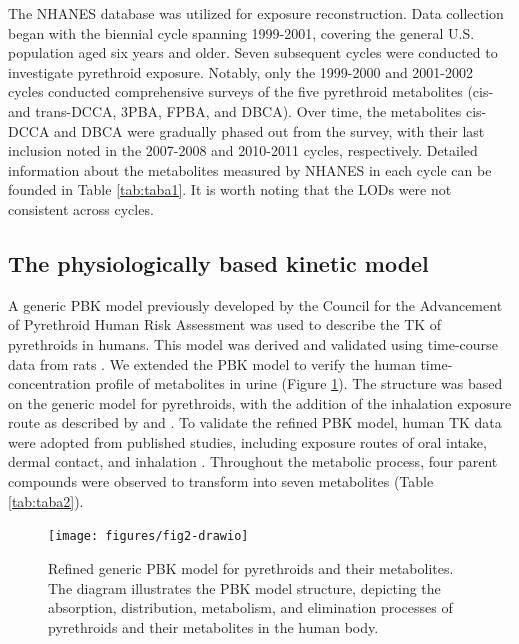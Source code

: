 \documentclass[toxics,article,submit,pdftex,moreauthors]{Definitions/mdpi}
\begin{document}
The NHANES database was utilized for exposure reconstruction. Data
collection began with the biennial cycle spanning 1999-2001, covering
the general U.S. population aged six years and older. Seven subsequent
cycles were conducted to investigate pyrethroid exposure. Notably, only
the 1999-2000 and 2001-2002 cycles conducted comprehensive surveys of
the five pyrethroid metabolites (cis- and trans-DCCA, 3PBA, FPBA, and DBCA). Over time,
the metabolites cis-DCCA and DBCA were gradually phased out from the
survey, with their last inclusion noted in the 2007-2008 and 2010-2011
cycles, respectively. Detailed information about the metabolites
measured by NHANES in each cycle can be founded in Table \ref{tab:taba1}.
It is worth noting that the LODs were not consistent across cycles.

\subsection{The physiologically based kinetic model}\label{the-physiologically-based-kinetic-model}

A generic PBK model previously developed by the Council for the
Advancement of Pyrethroid Human Risk Assessment
\citep{song2019evaluation, mallick2020development, mallick_physiologically_2020}
was used to describe the TK of pyrethroids in humans. This model was
derived and validated using time-course data from rats
\citep{mirfazaelian_development_2006, tornero2010evaluation}. We
extended the PBK model to verify the human time-concentration profile of
metabolites in urine (Figure \ref{fig:fig2}). The structure was based on
the generic model for pyrethroids, with the addition of the inhalation
exposure route as described by \citet{beaudouin2010stochastic} and
\citet{quindroit2019estimating}. To validate the refined PBK model,
human TK data were adopted from published studies, including exposure
routes of oral intake, dermal contact, and inhalation
\citep{leng1997human, leng1997biological, ratelle2015toxicokinetics, ratelle2015time}.
Throughout the metabolic process, four parent compounds were observed to
transform into seven metabolites (Table \ref{tab:taba2}).

\begin{figure}[H]
\texttt{[image: figures/fig2-drawio]} \caption{Refined generic PBK model for pyrethroids and their metabolites. The diagram illustrates the PBK model structure, depicting the absorption, distribution, metabolism, and elimination processes of pyrethroids and their metabolites in the human body.}\label{fig:fig2}
\end{figure}
\end{document}
